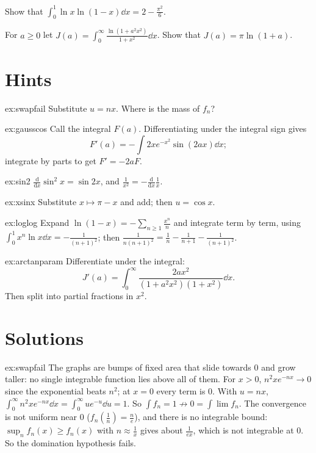 \begin{exercise}[$\star\star$]\label{ex:loglog}
Show that $\int_0^1\ln x\ln(1-x)\dd x=2-\frac{\pi^2}6$.
\end{exercise}

\begin{exercise}[$\star\star$]\label{ex:arctanparam}
For $a\ge0$ let
$J(a)=\int_0^\infty\frac{\ln(1+a^2x^2)}{1+x^2}\dd x$. Show that $J(a)=\pi\ln(1+a)$.
\end{exercise}

\section{Hints}

\begin{hint}{ex:swapfail}
Substitute $u=nx$. Where is the mass of $f_n$?
\end{hint}
\begin{hint}{ex:gausscos}
Call the integral $F(a)$. Differentiating under the integral sign gives
\[
F'(a)=-\int2xe^{-x^2}\sin(2ax)\dd x;
\]
integrate by parts to get $F'=-2aF$.
\end{hint}
\begin{hint}{ex:sin2}
$\frac{\mathrm d}{\mathrm dx}\sin^2x=\sin2x$, and $\frac1{x^2}=-\frac{\mathrm d}{\mathrm dx}\frac1x$.
\end{hint}
\begin{hint}{ex:xsinx}
Substitute $x\mapsto\pi-x$ and add; then $u=\cos x$.
\end{hint}
\begin{hint}{ex:loglog}
Expand $\ln(1-x)=-\sum_{n\ge1}\frac{x^n}n$ and integrate term by term, using $\int_0^1x^n\ln x\dd x=-\frac1{(n+1)^2}$; then
$\frac1{n(n+1)^2}=\frac1n-\frac1{n+1}-\frac1{(n+1)^2}$.
\end{hint}
\begin{hint}{ex:arctanparam}
Differentiate under the integral:
\[
J'(a)=\int_0^\infty\frac{2ax^2}{(1+a^2x^2)(1+x^2)}\dd x.
\]
Then split into partial fractions in $x^2$.
\end{hint}

\section{Solutions}

\begin{solution}{ex:swapfail}
\idea The graphs are bumps of fixed area that slide towards $0$ and grow taller: no single integrable function lies above all
of them.
\writeup For $x>0$, $n^2xe^{-nx}\to0$ since the exponential beats $n^2$; at $x=0$ every term is $0$. With $u=nx$,
$\int_0^\infty n^2xe^{-nx}\dd x=\int_0^\infty ue^{-u}\dd u=1$. So $\int f_n=1\not\to0=\int\lim f_n$. The convergence is not uniform near $0$
($f_n(\frac1n)=\frac ne$), and there is no integrable bound: $\sup_nf_n(x)\ge f_n(x)$ with $n\approx\frac1x$ gives about $\frac1{ex}$, which
is not integrable at $0$. So the domination hypothesis fails.
\end{solution}

